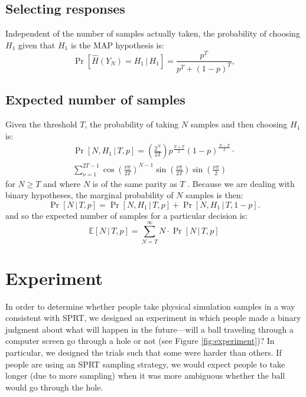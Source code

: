 \documentclass[10pt,letterpaper]{article}
\begin{document}
\subsection{Selecting responses} Independent of the number of samples actually taken, the probability of choosing $H_1$ given that $H_1$ is the MAP hypothesis is:
\begin{equation}
\Pr[\hat{H}(Y_N)=H_1\,|\,H_1]=\frac{p^T}{p^T+(1-p)^T},
\label{eq:pr-choose-h1}
\end{equation}

\subsection{Expected number of samples} Given the threshold $T$, the probability of taking $N$ samples and then choosing $H_1$ is:
\begin{multline}
\Pr[N,H_1\,|\,T,p]=\left(\frac{2^N}{2T}\right)p^{\frac{N+T}{2}}(1-p)^{\frac{N-T}{2}}\cdot{}\\
\sum_{\nu=1}^{2T-1}\cos\left(\frac{\nu\pi}{2T}\right)^{N-1}\sin\left(\frac{\nu\pi}{2T}\right)\sin\left(\frac{\nu\pi}{2}\right)
\end{multline}
for $N\geq T$ and where $N$ is of the same parity as $T$ \cite[ch.~XIV, eq. 5.7]{Feller:1968ut}. Because we are dealing with binary hypotheses, the marginal probability of $N$ samples is then:
\begin{equation}
\Pr[N\,|\,T,p]=\Pr[N,H_1\,|\,T,p]+\Pr[N,H_1\,|\,T,1-p].
\label{eq:pr-n}
\end{equation}
and so the expected number of samples for a particular decision is:
\begin{equation}
\mathbb{E}[N\,|\,T,p]=\sum_{N=T}^\infty N\cdot{}\Pr[N\,|\,T,p]
\label{eq:expsamp}
\end{equation}

\section{Experiment}

In order to determine whether people take physical simulation samples in a way consistent with SPRT, we designed an experiment in which people made a binary judgment about what will happen in the future---will a ball traveling through a computer screen go through a hole or not (see Figure \ref{fig:experiment})? In particular, we designed the trials such that some were harder than others. If people are using an SPRT sampling strategy, we would expect people to take longer (due to more sampling) when it was more ambiguous whether the ball would go through the hole.
\end{document}
